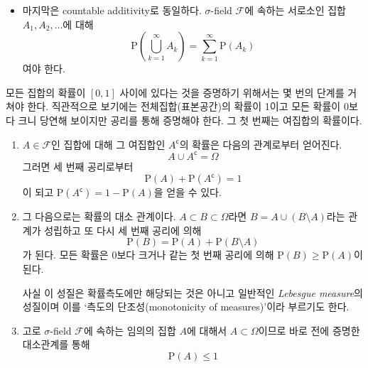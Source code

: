 \documentclass[answers]{exam}
\begin{document}
\begin{questions}
\begin{solution}
\begin{itemize}
        \item 마지막은 countable additivity로 동일하다. $\sigma$-field $\mathcal{F}$에 속하는 서로소인 집합 $A_{1},A_{2},\ldots$에 대해
        \begin{equation}
          \mathrm{P}\left(\bigcup_{k=1}^{\infty}A_{k}\right) = \sum_{k=1}^{\infty}\mathrm{P}\left(A_{k}\right)
        \end{equation}
        여야 한다.
      \end{itemize}
      모든 집합의 확률이 $\left[0,1\right]$ 사이에 있다는 것을 증명하기 위해서는 몇 번의 단계를 거쳐야 한다. 직관적으로 보기에는 전체집합(표본공간)의 확률이 1이고 모든 확률이 0보다 크니 당연해 보이지만 공리를 통해 증명해야 한다. 그 첫 번째는 여집합의 확률이다.
      \begin{enumerate}[(1)]
        \item $A\in\mathcal{F}$인 집합에 대해 그 여집합인 $A^{\mathsf{c}}$의 확률은 다음의 관계로부터 얻어진다.
        \begin{equation}
          A \cup A^{\mathsf{c}} = \Omega
        \end{equation}
        그러면 세 번째 공리로부터
        \begin{equation}
          \mathrm{P}\left(A\right)+\mathrm{P}\left(A^{\mathsf{c}}\right) = 1
        \end{equation}
        이 되고 $\mathrm{P}\left(A^{\mathsf{c}}\right) = 1-\mathrm{P}\left(A\right)$을 얻을 수 있다.
        \item 그 다음으로는 확률의 대소 관계이다. $A\subset B \subset \Omega$라면 $B=A \cup \left(B\setminus A\right)$라는 관계가 성립하고 또 다시 세 번째 공리에 의해
        \begin{equation}
          \mathrm{P}\left(B\right) = \mathrm{P}\left(A\right)+\mathrm{P}\left(B\setminus A\right)
        \end{equation}
        가 된다. 모든 확률은 0보다 크거나 같는 첫 번째 공리에 의해 $\mathrm{P}\left(B\right)\geq \mathrm{P}\left(A\right)$이 된다.\par
        사실 이 성질은 확률측도에만 해당되는 것은 아니고 일반적인 \emph{Lebesgue measure}의 성질이며 이를 `측도의 단조성(monotonicity of measures)'이라 부르기도 한다.
        \item 고로 $\sigma$-field $\mathcal{F}$에 속하는 임의의 집합 $A$에 대해서 $A\subset \Omega$이므로 바로 전에 증명한 대소관계를 통해
        \begin{equation}
          \mathrm{P}\left(A\right) \leq 1
        \end{equation}

\end{enumerate}
\end{solution}
\end{questions}
\end{document}
